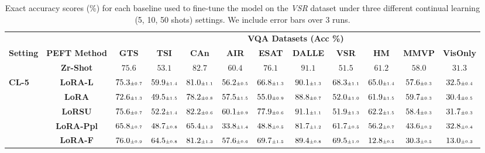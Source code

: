 \begin{table}
\caption{Exact accuracy scores (\%) for each baseline used to fine-tune the model on the \emph{VSR} dataset under three different continual learning (5, 10, 50 shots)  settings. We include error bars over 3 runs.}
 \label{table:fine_tune_llm_vsr}
 \vskip 0.15in
\begin{center}
\begin{small}
\begingroup
\setlength{\tabcolsep}{3.6pt}
\begin{tabular}{l c c c c c c c c c c c}
\toprule
 & & \multicolumn{10}{c}{\textbf{VQA Datasets (Acc \%)}}  \\
\cmidrule(lr){3-12}
\textbf{Setting} & \textbf{PEFT Method}  & \textbf{GTS} & \textbf{TSI} & \textbf{CAn} & \textbf{AIR} & \textbf{ESAT} & \textbf{DALLE} & \textbf{VSR} & \textbf{HM} & \textbf{MMVP} & \textbf{VisOnly} \\
\midrule
 & \textbf{Zr-Shot} & $75.6$ & $53.1$ & $82.7$ & $60.4$ & $76.1$ & $91.1$ & $51.5$ & $61.2$ & $58.0$ & $31.3$ \\
\midrule
\multirow{6}{*}{\textbf{CL-5}} & \textbf{LoRA-L} & $75.3 \mbox{\tiny\ensuremath{\pm 0.7}}$ & $59.9 \mbox{\tiny\ensuremath{\pm 1.4}}$ & $81.0 \mbox{\tiny\ensuremath{\pm 1.1}}$ & $56.2 \mbox{\tiny\ensuremath{\pm 0.5}}$ & $66.8 \mbox{\tiny\ensuremath{\pm 1.3}}$ & $90.1 \mbox{\tiny\ensuremath{\pm 1.3}}$ & $68.3 \mbox{\tiny\ensuremath{\pm 1.1}}$ & $65.0 \mbox{\tiny\ensuremath{\pm 1.4}}$ & $57.6 \mbox{\tiny\ensuremath{\pm 0.3}}$ & $32.5 \mbox{\tiny\ensuremath{\pm 0.4}}$ \\
& \textbf{LoRA} & $72.6 \mbox{\tiny\ensuremath{\pm 1.3}}$ & $49.5 \mbox{\tiny\ensuremath{\pm 1.5}}$ & $78.2 \mbox{\tiny\ensuremath{\pm 0.8}}$ & $57.5 \mbox{\tiny\ensuremath{\pm 1.5}}$ & $55.0 \mbox{\tiny\ensuremath{\pm 0.9}}$ & $88.8 \mbox{\tiny\ensuremath{\pm 0.7}}$ & $52.0 \mbox{\tiny\ensuremath{\pm 1.0}}$ & $61.9 \mbox{\tiny\ensuremath{\pm 1.5}}$ & $59.7 \mbox{\tiny\ensuremath{\pm 0.3}}$ & $30.4 \mbox{\tiny\ensuremath{\pm 0.5}}$ \\
& \textbf{LoRSU} & $75.6 \mbox{\tiny\ensuremath{\pm 0.7}}$ & $52.2 \mbox{\tiny\ensuremath{\pm 1.4}}$ & $82.2 \mbox{\tiny\ensuremath{\pm 0.6}}$ & $60.1 \mbox{\tiny\ensuremath{\pm 0.9}}$ & $77.9 \mbox{\tiny\ensuremath{\pm 0.6}}$ & $91.1 \mbox{\tiny\ensuremath{\pm 1.1}}$ & $51.9 \mbox{\tiny\ensuremath{\pm 1.3}}$ & $62.2 \mbox{\tiny\ensuremath{\pm 1.5}}$ & $58.4 \mbox{\tiny\ensuremath{\pm 0.3}}$ & $31.7 \mbox{\tiny\ensuremath{\pm 0.3}}$ \\
& \textbf{LoRA-Ppl} & $65.8 \mbox{\tiny\ensuremath{\pm 0.7}}$ & $48.7 \mbox{\tiny\ensuremath{\pm 0.8}}$ & $65.4 \mbox{\tiny\ensuremath{\pm 1.3}}$ & $33.8 \mbox{\tiny\ensuremath{\pm 1.4}}$ & $48.8 \mbox{\tiny\ensuremath{\pm 0.5}}$ & $81.7 \mbox{\tiny\ensuremath{\pm 1.2}}$ & $61.7 \mbox{\tiny\ensuremath{\pm 0.5}}$ & $56.2 \mbox{\tiny\ensuremath{\pm 0.7}}$ & $43.6 \mbox{\tiny\ensuremath{\pm 0.2}}$ & $32.8 \mbox{\tiny\ensuremath{\pm 0.4}}$ \\
& \textbf{LoRA-F} & $76.0 \mbox{\tiny\ensuremath{\pm 0.9}}$ & $64.5 \mbox{\tiny\ensuremath{\pm 0.8}}$ & $81.2 \mbox{\tiny\ensuremath{\pm 1.3}}$ & $57.6 \mbox{\tiny\ensuremath{\pm 0.6}}$ & $69.7 \mbox{\tiny\ensuremath{\pm 1.5}}$ & $89.4 \mbox{\tiny\ensuremath{\pm 0.8}}$ & $69.5 \mbox{\tiny\ensuremath{\pm 1.0}}$ & $12.8 \mbox{\tiny\ensuremath{\pm 0.5}}$ & $30.3 \mbox{\tiny\ensuremath{\pm 0.5}}$ & $13.0 \mbox{\tiny\ensuremath{\pm 0.3}}$ \\

\end{tabular}
\end{small}
\end{center}
\end{table}
